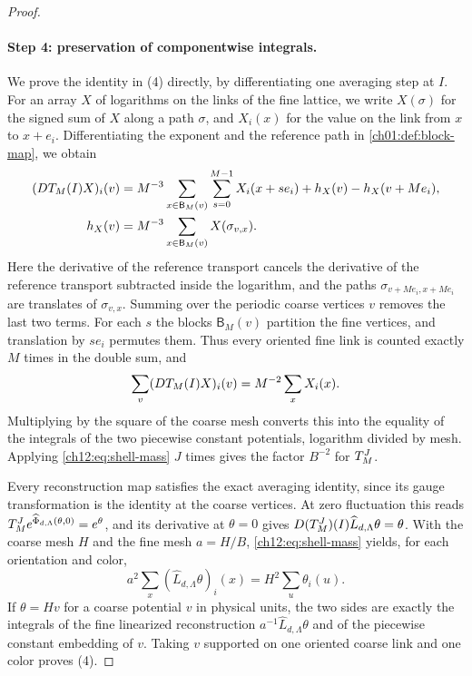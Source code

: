 \begin{proof}
\paragraph{Step 4: preservation of componentwise integrals.}
We prove the identity in (4) directly, by differentiating one averaging step at $I$. For an array $X$ of logarithms on the links of the fine lattice, we write $X(\sigma)$ for the signed sum of $X$ along a path $\sigma$, and $X_i(x)$ for the value on the link from $x$ to $x+e_i$. Differentiating the exponent and the reference path in \cref{ch01:def:block-map}, we obtain
\begin{equation}
 \begin{split}
 (DT_M(I)X)_i(v)&=M^{-3}\sum_{x\in\mathsf B_M(v)}\sum_{s=0}^{M-1}X_i(x+se_i)+h_X(v)-h_X(v+Me_i),\\
 h_X(v)&=M^{-3}\sum_{x\in\mathsf B_M(v)}X(\sigma_{v,x}).
 \end{split}\label{ch12:eq:ordinary-mass}
\end{equation}
Here the derivative of the reference transport cancels the derivative of the reference transport subtracted inside the logarithm, and the paths $\sigma_{v+Me_i,x+Me_i}$ are translates of $\sigma_{v,x}$. Summing over the periodic coarse vertices $v$ removes the last two terms. For each $s$ the blocks $\mathsf B_M(v)$ partition the fine vertices, and translation by $se_i$ permutes them. Thus every oriented fine link is counted exactly $M$ times in the double sum, and
\begin{equation}
 \sum_v(DT_M(I)X)_i(v)=M^{-2}\sum_xX_i(x). \label{ch12:eq:shell-mass}
\end{equation}
Multiplying by the square of the coarse mesh converts this into the equality of the integrals of the two piecewise constant potentials, logarithm divided by mesh. Applying \eqref{ch12:eq:shell-mass} $J$ times gives the factor $B^{-2}$ for $T_M^J$.

Every reconstruction map satisfies the exact averaging identity, since its gauge transformation is the identity at the coarse vertices. At zero fluctuation this reads $T_M^J e^{\widehat\Phi_{d,\Lambda}(\theta,0)}=e^\theta$, and its derivative at $\theta=0$ gives $D(T_M^J)(I)\widehat L_{d,\Lambda}\theta=\theta$. With the coarse mesh $H$ and the fine mesh $a=H/B$, \eqref{ch12:eq:shell-mass} yields, for each orientation and color,
\begin{equation}
 a^2\sum_x(\widehat L_{d,\Lambda}\theta)_i(x)=H^2\sum_u\theta_i(u). \label{ch12:eq:column-mass}
\end{equation}
If $\theta=Hv$ for a coarse potential $v$ in physical units, the two sides are exactly the integrals of the fine linearized reconstruction $a^{-1}\widehat L_{d,\Lambda}\theta$ and of the piecewise constant embedding of $v$. Taking $v$ supported on one oriented coarse link and one color proves (4).


\end{proof}
